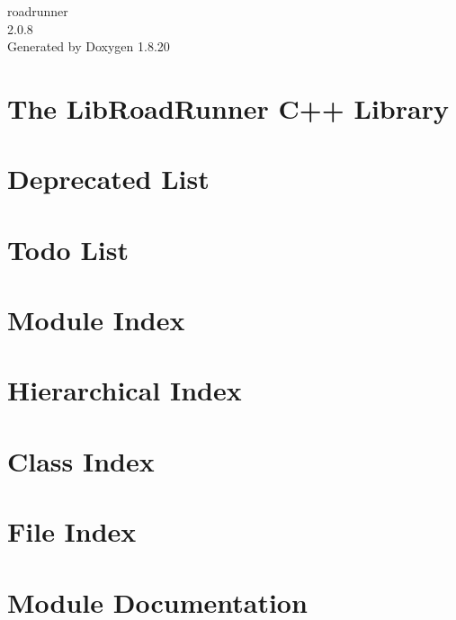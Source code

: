 \let\mypdfximage\pdfximage\def\pdfximage{\immediate\mypdfximage}\documentclass[twoside]{book}
\newcommand{\+}{\discretionary{\mbox{\scriptsize$\hookleftarrow$}}{}{}}
\newcommand{\clearemptydoublepage}{%
  \newpage{\pagestyle{empty}\cleardoublepage}%
}
\begin{document}
\hypersetup{pageanchor=false,
             bookmarksnumbered=true,
             pdfencoding=unicode
            }
\begin{titlepage}
\vspace*{7cm}
\begin{center}%
{\Large roadrunner \\[1ex]\large 2.\+0.\+8 }\\
\vspace*{1cm}
{\large Generated by Doxygen 1.8.20}\\
\end{center}
\end{titlepage}
\clearemptydoublepage
{}
\tableofcontents
\clearemptydoublepage
{}
\hypersetup{pageanchor=true}

\chapter{The Lib\+Road\+Runner C++ Library}
\label{index}\hypertarget{index}{}
\chapter{Deprecated List}
\label{deprecated}

\chapter{Todo List}
\label{todo}

\chapter{Module Index}

\chapter{Hierarchical Index}

\chapter{Class Index}

\chapter{File Index}

\chapter{Module Documentation}





























\end{document}
